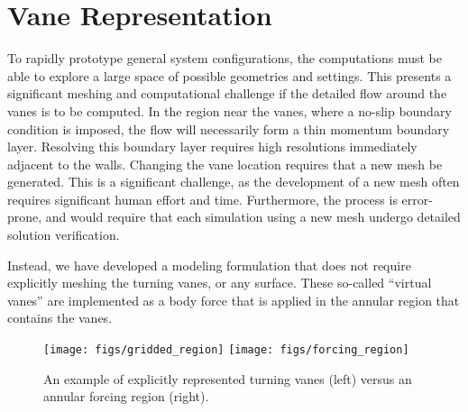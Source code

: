 


\section{Vane Representation}
\label{subsec:vane}
To rapidly prototype general system configurations, the
computations must be able to explore a large space of possible
geometries and settings. This presents a significant meshing and 
computational challenge if the detailed flow around the vanes is to be
computed. In the region near the vanes, where a no-slip boundary
condition is imposed, the flow will necessarily form a thin momentum
boundary layer. Resolving this boundary layer requires high resolutions
immediately adjacent to the walls. Changing the vane location requires
that a new mesh be generated. This is a significant
challenge, as the development of a new mesh often requires significant
human effort and time. Furthermore, the process is error-prone, 
and would require that each simulation using a new mesh undergo 
detailed solution verification. 



Instead, we have developed a modeling formulation that does not require
explicitly meshing the turning vanes, or any surface. These so-called
``virtual vanes'' are implemented as a body force that 
is applied in the annular region that contains the vanes. 

   \begin{figure}[!htb]
    \centering
    \texttt{[image: figs/gridded\_region]}
    \hfill
    \texttt{[image: figs/forcing\_region]}
     \caption{An example of explicitly represented turning vanes (left)
    versus an annular forcing region (right).}
     \label{fig:penalty_model}
   \end{figure}



